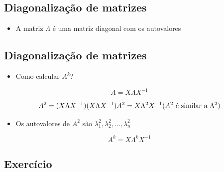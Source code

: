 \documentclass[
  letterpaper,
  DIV=11,
  numbers=noendperiod]{scrartcl}
\providecommand{\tightlist}{%
  \setlength{\itemsep}{0pt}\setlength{\parskip}{0pt}}\usepackage{longtable,booktabs,array}
\begin{document}
\hypertarget{diagonalizauxe7uxe3o-de-matrizes-2}{%
\subsection{Diagonalização de
matrizes}\label{diagonalizauxe7uxe3o-de-matrizes-2}}

\begin{itemize}
\tightlist
\item
  A matriz \(\Lambda\) é uma matriz diagonal com os autovalores
\end{itemize}

\hypertarget{diagonalizauxe7uxe3o-de-matrizes-3}{%
\subsection{Diagonalização de
matrizes}\label{diagonalizauxe7uxe3o-de-matrizes-3}}

\begin{itemize}
\tightlist
\item
  Como calcular \(A^k\)?
\end{itemize}

\[A = X\Lambda X^{-1}\]

\begin{tcolorbox}[enhanced jigsaw, arc=.35mm, opacityback=0, bottomtitle=1mm, left=2mm, coltitle=black, rightrule=.15mm, colbacktitle=quarto-callout-note-color!10!white, breakable, opacitybacktitle=0.6, bottomrule=.15mm, title=\textcolor{quarto-callout-note-color}{\faInfo}\hspace{0.5em}{Note}, titlerule=0mm, colframe=quarto-callout-note-color-frame, toprule=.15mm, toptitle=1mm, leftrule=.75mm, colback=white]
\[ A^2 = (X\Lambda X^{-1})(X\Lambda X^{-1})\\A^2 = X\Lambda^2 X^{-1} (A^2 \text{ é similar a } \Lambda^2)\]

\begin{itemize}
\tightlist
\item
  Os autovalores de \(A^2\) são
  \(\lambda_1^2,\lambda_2^2, \ldots, \lambda_n^2\)
\end{itemize}

\[ A^k = X\Lambda^k X^{-1}\]
\end{tcolorbox}

\hypertarget{exercuxedcio}{%
\subsection{Exercício}\label{exercuxedcio}}
\end{document}
